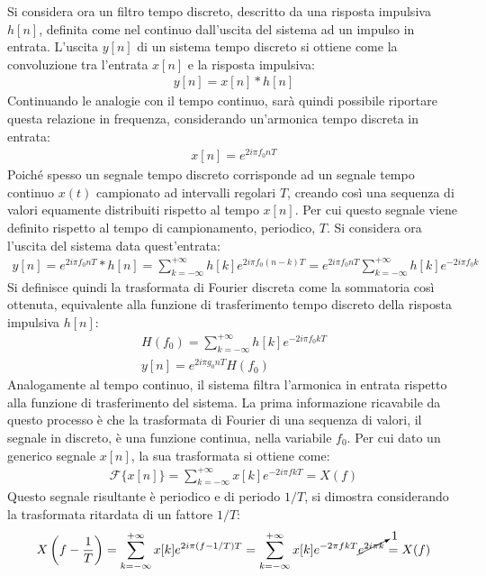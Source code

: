 \documentclass{article}
\numberwithin{equation}{subsection}
\begin{document}
Si considera ora un filtro tempo discreto, descritto da una risposta impulsiva $h[n]$, definita come nel continuo dall'uscita del sistema ad un impulso in entrata. L'uscita 
$y[n]$ di un sistema tempo discreto si ottiene come la convoluzione tra l'entrata $x[n]$ e la risposta impulsiva:
\begin{gather*}
    y[n]=x[n]*h[n]
\end{gather*}
Continuando le analogie con il tempo continuo, sarà quindi possibile riportare questa relazione in frequenza, considerando un'armonica tempo discreta in entrata:
\begin{gather*}
    x[n]=e^{2i\pi f_0nT}
\end{gather*}
Poiché spesso un segnale tempo discreto corrisponde ad un segnale tempo continuo $x(t)$ campionato ad intervalli regolari $T$, creando così una sequenza di valori equamente 
distribuiti rispetto al tempo $x[n]$. Per cui questo segnale viene definito rispetto al tempo di campionamento, periodico, $T$. Si considera ora l'uscita del sistema 
data quest'entrata:
\begin{gather*}
    y[n]=e^{2i\pi f_0nT}*h[n]=\displaystyle\sum_{k=-\infty}^{+\infty}h[k]e^{2i\pi f_0(n-k)T}=e^{2i\pi f_0nT}\displaystyle\sum_{k=-\infty}^{+\infty}h[k]e^{-2i\pi f_0k}
\end{gather*}
Si definisce quindi la trasformata di Fourier discreta come la sommatoria così ottenuta, equivalente alla funzione di trasferimento tempo discreto della risposta 
impulsiva $h[n]$:
\begin{gather*}
    H(f_0)=\displaystyle\sum_{k=-\infty}^{+\infty}h[k]e^{-2i\pi f_0kT}\\
    y[n]=e^{2i\pi g_0nT}H(f_0)
\end{gather*}
Analogamente al tempo continuo, il sistema filtra l'armonica in entrata rispetto alla funzione di trasferimento del sistema. 
La prima informazione ricavabile da questo processo è che la trasformata di Fourier di una sequenza di valori, il segnale in discreto, è una funzione continua, nella 
variabile $f_0$. Per cui dato un generico segnale $x[n]$, la sua trasformata si ottiene come:
\begin{gather*}
    \mathscr{F}\{x[n]\}=\displaystyle\sum_{k=-\infty}^{+\infty}x[k]e^{-2i\pi fkT}=X(f)
\end{gather*}
Questo segnale risultante è periodico e di periodo $1/T$, si dimostra considerando la trasformata ritardata di un fattore $1/T$:
\begin{gather*}
    X\left(\displaystyle f-\frac{1}{T}\right)=\displaystyle\sum_{k=-\infty}^{+\infty}x[k]e^{2i\pi (f-1/T)T}=\displaystyle\sum_{k=-\infty}^{+\infty}x[k]e^{-2\pi fkT}\cancelto{1}{e^{2i\pi k}}=X(f)
\end{gather*}
\end{document}
